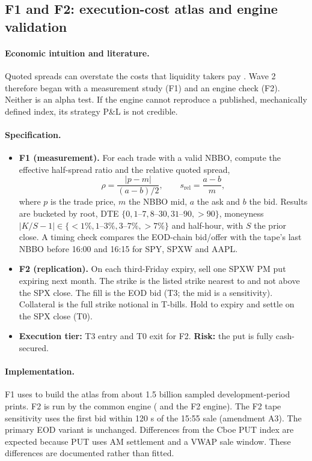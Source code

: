 \documentclass[../main.tex]{subfiles}
\begin{document}
\subsection{F1 and F2: execution-cost atlas and engine validation}\label{sec:f1f2}

\paragraph{Economic intuition and literature.}
Quoted spreads can overstate the costs that liquidity takers pay \citep{muravyevpearson2020}. Wave 2 therefore began with a measurement study (F1) and an engine check (F2). Neither is an alpha test. If the engine cannot reproduce a published, mechanically defined index, its strategy P\&L is not credible.

\paragraph{Specification.}
\begin{itemize}
\item \textbf{F1 (measurement).} For each trade with a valid NBBO, compute the effective half-spread ratio and the relative quoted spread,
\begin{equation}
\rho = \frac{|p - m|}{(a - b)/2}, \qquad s_{\mathrm{rel}} = \frac{a - b}{m},
\end{equation}
where $p$ is the trade price, $m$ the NBBO mid, $a$ the ask and $b$ the bid. Results are bucketed by root, DTE $\{0, 1\text{--}7, 8\text{--}30, 31\text{--}90, >90\}$, moneyness $|K/S - 1| \in \{<1\%, 1\text{--}3\%, 3\text{--}7\%, >7\%\}$ and half-hour, with $S$ the prior close. A timing check compares the EOD-chain bid/offer with the tape's last NBBO before 16:00 and 16:15 for SPY, SPXW and AAPL.
\item \textbf{F2 (replication).} On each third-Friday expiry, sell one SPXW PM put expiring next month. The strike is the listed strike nearest to and not above the SPX close. The fill is the EOD bid (T3; the mid is a sensitivity). Collateral is the full strike notional in T-bills. Hold to expiry and settle on the SPX close (T0).
\item \textbf{Execution tier:} T3 entry and T0 exit for F2. \textbf{Risk:} the put is fully cash-secured.
\end{itemize}

\paragraph{Implementation.}
F1 uses  to build the atlas from about 1.5 billion sampled development-period prints. F2 is run by the common engine ( and the F2 engine). The F2 tape sensitivity uses the first bid within 120 s of the 15:55 sale (amendment A3). The primary EOD variant is unchanged. Differences from the Cboe PUT index are expected because PUT uses AM settlement and a VWAP sale window. These differences are documented rather than fitted.
\end{document}
